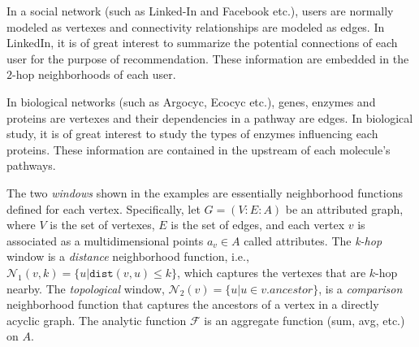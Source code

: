 %
%
%
%
%

\begin{example}
In a social network (such as Linked-In and Facebook etc.), users are normally modeled as vertexes and connectivity relationships are modeled as edges. In LinkedIn, it is of great interest to summarize the potential connections of each user for the purpose of recommendation. These information are embedded in the $2$-hop neighborhoods of each user.
%
\end{example}
\begin{example}
In biological networks (such as Argocyc, Ecocyc etc.), genes, enzymes and proteins are vertexes and their
dependencies in a pathway are edges. In biological study, it is of great interest to study the types of enzymes influencing each proteins. These information are contained in the upstream of each molecule's pathways.
%
\end{example}

The two \emph{windows} shown in the examples are essentially neighborhood functions defined for each vertex. Specifically, let $G=(V:E:A)$ be an attributed graph, where $V$ is the set of vertexes, $E$ is the set of edges, and each vertex $v$ is associated as a multidimensional points $a_v \in A$ called attributes.
The \emph{k-hop} window is a \emph{distance} neighborhood function, 
i.e., $\mathcal{N}_1(v,k)= \{u|\mathtt{dist}(v,u) \leq k\}$, 
which captures the vertexes that are $k$-hop nearby. 
The \emph{topological} window,  $\mathcal{N}_2(v)= \{u | u \in v.ancestor\}$,
is a \emph{comparison} neighborhood function that captures
the ancestors of a vertex in a directly acyclic graph.  The analytic function $\mathcal{F}$ is an aggregate function (sum, avg, etc.) on $A$.

